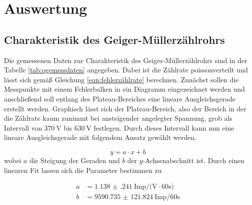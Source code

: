 \section{Auswertung}

\subsection{Charakteristik des Geiger-Müllerzählrohrs}
\label{sec:charakteristik}

Die gemessenen Daten zur Charakteristik des Geiger-Müllerzählrohrs sind in der Tabelle \ref{tab:ogemessdaten}
angegeben. Dabei ist die Zählrate poissonverteilt und lässt sich gemäß Gleichung \ref{eqn:fehlerzählrate} berechnen.
\newline
Zunächst sollen die Messpunkte mit einem Fehlerbalken in ein Diagramm eingezeichnet werden und anschließend soll entlang des Plateau-Bereiches
eine lineare Ausgleichsgerade erstellt werden. Graphisch lässt sich der Plateau-Bereich, also der Bereich in der die Zählrate kaum zunimmt bei ansteigender angelegter Spannung, grob
als Intervall von $\SI{370}{\volt}$ bis $\SI{630}{\volt}$ festlegen. Durch dieses Intervall kann nun eine lineare Ausgleichsgerade mit folgendem Ansatz gewählt werden.

\begin{equation}
y = a \cdot x + b
\end{equation}
wobei $a$ die Steigung der Geraden und $b$ der $y$-Achsenabschnitt ist.
Durch einen linearen Fit lassen sich die Parameter bestimmen zu

\begin{align}
\label{eqn:Param}
a &= \SI{1.138(241)}{{\text{Imp}}\per(\volt\cdot{60}\second)} \\
b &= \SI{9590.735(121824)}{{\text{Imp}}\per{60}\second}
\end{align}

